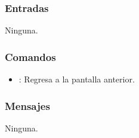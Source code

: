 \subsubsection{Entradas}
	\noindent
	Ninguna.

\subsubsection{Comandos}
	\begin{itemize}
		\item {}: Regresa a la pantalla anterior.
	\end{itemize}

\subsubsection{Mensajes}
	\noindent
	Ninguna.
